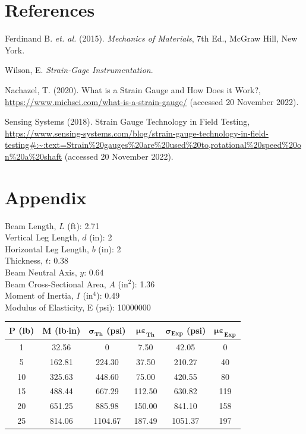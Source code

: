 \documentclass{article}
\begin{document}
    \section{References}
    \begin{description}
        \item Ferdinand B. \emph{et. al.} (2015). \emph{Mechanics of Materials}, 7th Ed., McGraw Hill, New York.
        \item Wilson, E. \emph{Strain-Gage Instrumentation}.
        \item Nachazel, T. (2020). What is a Strain Gauge and How Does it Work?, \url{https://www.michsci.com/what-is-a-strain-gauge/} (accessed 20 November 2022).
        \item Sensing Systems (2018). Strain Gauge Technology in Field Testing, \url{https://www.sensing-systems.com/blog/strain-gauge-technology-in-field-testing#:~:text=Strain%20gauges%20are%20used%20to,rotational%20speed%20on%20a%20shaft} (accessed 20 November 2022).
        
    \end{description}
    \newpage
    \section{Appendix}
    \begin{center}
    \noindent Beam Length, \(L\) (ft): 2.71\\
    Vertical Leg Length, \(d\) (in):  2\\
    Horizontal Leg Length, \(b\) (in): 2\\
    Thickness, \(t\): 0.38\\
    Beam Neutral Axis, \(y\): 0.64\\
    Beam Cross-Sectional Area, \(A\) (\(\text{in}^2\)): 1.36\\
    Moment of Inertia, \(I\) (\(\text{in}^4\)): 0.49\\
    Modulus of Elasticity, E (psi): 10000000\\
    \end{center}
    \begin{center}
        \begin{tabular}{|c | c | c c | c c|}
            \hline
            \textbf{P (lb)} & \textbf{M (lb\(\cdot\)in)} & \(\bm{\sigma}_\textbf{Th}\)\textbf{ (psi)} & \(\bm{\mu\varepsilon}_\textbf{Th}\) &  \(\bm{\sigma}_\textbf{Exp}\)\textbf{ (psi)} & \(\bm{\mu\varepsilon}_\textbf{Exp}\)\\ \hline
            1&  32.56&      0&       7.50&               42.05&    0\\\hline
            5&  162.81&     224.30&        37.50&      210.27&   40\\\hline
            10& 325.63&     448.60&      75.00&      420.55&   80\\\hline
            15& 488.44&     667.29&        112.50&     630.82&   119\\\hline
            20& 651.25&     885.98&      150.00&     841.10&   158\\\hline
            25& 814.06&     1104.67&     187.49&     1051.37&  197\\\hline
        \end{tabular}
    \end{center}
\end{document}

